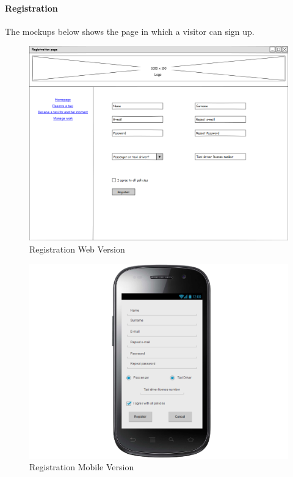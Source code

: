 \documentclass[a4paper,12pt,dvipsnames]{article}%
\begin{document}
\paragraph{Registration}
The mockups below shows the page in which a visitor can sign up.
\begin{figure}[H]
\centering
\includegraphics[scale=0.35]{mockups/registration_web.png}
\caption{Registration Web Version}
\end{figure}
\begin{figure}[H]
\centering
\includegraphics[scale=0.35]{mockups/registration_mobile.png}
\caption{Registration Mobile Version}
\end{figure}
\break
\end{document}
